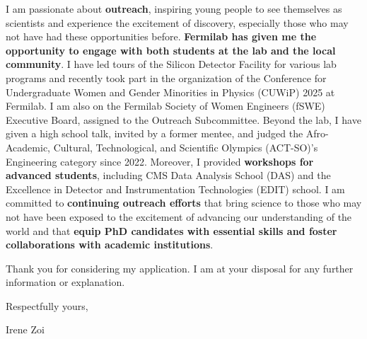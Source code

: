 {\begin{flushleft}


I am passionate about {\bf outreach}, inspiring young people to see themselves as scientists and experience the excitement of discovery, especially those who may not have had these opportunities before. {\bf Fermilab has given me the opportunity to engage with both students at the lab and the local community}. I have led tours of the Silicon Detector Facility for various lab programs and recently took part in the organization of the Conference for Undergraduate Women and Gender Minorities in Physics (CUWiP) 2025 at Fermilab. I am also on the Fermilab Society of Women Engineers (fSWE) Executive Board, assigned to the Outreach Subcommittee. Beyond the lab, I have given a high school talk, invited by a former mentee, and judged the Afro-Academic, Cultural, Technological, and Scientific Olympics (ACT-SO)’s Engineering category since 2022. Moreover, I  provided {\bf workshops for advanced students}, including CMS Data Analysis School (DAS) and the Excellence in Detector and Instrumentation Technologies (EDIT) school. I am committed to {\bf continuing outreach efforts} that bring science to those who may not have been exposed to the excitement of advancing our understanding of the world and that {\bf equip PhD candidates with essential skills and foster collaborations with academic institutions}.


Thank you for considering my application. I am at your disposal for any further information or explanation.

Respectfully yours,

Irene Zoi
\end{flushleft}

}
